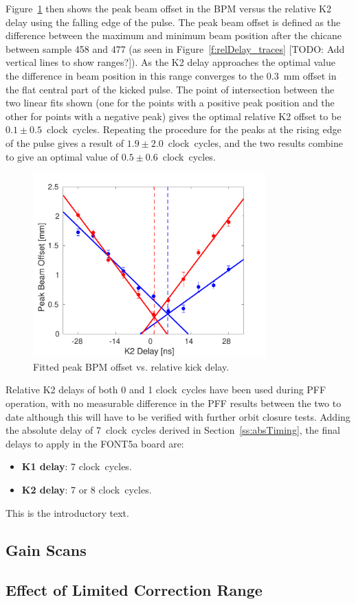 Figure~\ref{f:relDelay_fit} then shows the peak beam offset in the BPM versus the relative K2 delay using the falling edge of the pulse. The peak beam offset is defined as the difference between the maximum and minimum beam position after the chicane between sample 458 and 477 (as seen in Figure~\ref{f:relDelay_traces} [TODO: Add vertical lines to show ranges?]). As the K2 delay approaches the optimal value the difference in beam position in this range converges to the 0.3~mm offset in the flat central part of the kicked pulse. The point of intersection between the two linear fits shown (one for the points with a positive peak position and the other for points with a negative peak) gives the optimal relative K2 offset to be \(0.1\pm0.5\)~clock~cycles. Repeating the procedure for the peaks at the rising edge of the pulse gives a result of \(1.9\pm2.0\)~clock~cycles, and the two results combine to give an optimal value of \(0.5\pm0.6\)~clock~cycles.

\begin{figure}
  \centering
  \includegraphics[width=0.8\textwidth]{Figures/commissioning/relDelay_fit}
  \caption{Fitted peak BPM offset vs. relative kick delay.}
  \label{f:relDelay_fit}
\end{figure}

Relative K2 delays of both 0 and 1 clock~cycles have been used during PFF operation, with no measurable difference in the PFF results between the two to date although this will have to be verified with further orbit closure tests. Adding the absolute delay of 7~clock~cycles derived in Section~\ref{ss:absTiming}, the final delays to apply in the FONT5a board are:
\begin{itemize}
\item \textbf{K1 delay}: 7 clock~cycles.
\item \textbf{K2 delay}: 7 or 8 clock~cycles.
\end{itemize}


This is the introductory text.

\subsection{Gain Scans}
\label{ss:gainScans}

\subsection{Effect of Limited Correction Range}
\label{ss:effectLimRange}

